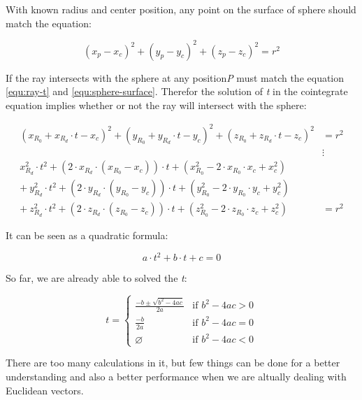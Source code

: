 With known radius and center position, any point on the surface of sphere should match the equation:

\begin{equation}\label{equ:sphere-surface}
(x_{p} - x_{c})^2 + (y_{p} - y_{c})^2 + (z_{p} - z_{c})^2 = r^2
\end{equation}

If the ray intersects with the sphere at any position\emph{P} must match the equation \ref{equ:ray-t} and \ref{equ:sphere-surface}. Therefor the solution of \emph{t} in the cointegrate equation implies whether or not the ray will intersect with the sphere:

\begin{equation}\label{equ:ray-sphere}
\begin{aligned}
(x_{R_{0}} + x_{R_{d}} \cdot t - x_{c})^2 + (y_{R_{0}} + y_{R_{d}} \cdot t - y_{c})^2 + (z_{R_{0}} + z_{R_{d}} \cdot t - z_{c})^2 &= r^2 \\
&\vdots \\
x_{R_{d}}^2 \cdot t^2 + (2 \cdot x_{R_{d}} \cdot (x_{R_{0}} - x_{c})) \cdot t + (x_{R_{0}}^2 - 2 \cdot x_{R_{0}}\cdot x_{c} + x_{c}^2) & \\
+\ y_{R_{d}}^2 \cdot t^2 + (2 \cdot y_{R_{d}} \cdot (y_{R_{0}} - y_{c})) \cdot t + (y_{R_{0}}^2 - 2 \cdot y_{R_{0}}\cdot y_{c} + y_{c}^2) & \\
+\ z_{R_{d}}^2 \cdot t^2 + (2 \cdot z_{R_{d}} \cdot (z_{R_{0}} - z_{c})) \cdot t + (z_{R_{0}}^2 - 2 \cdot z_{R_{0}}\cdot z_{c} + z_{c}^2) &= r^2
\end{aligned}
\end{equation}

It can be seen as a quadratic formula:

\begin{equation}\label{equ:sphere-surface-quadratic-formula}
a \cdot t^2 + b \cdot t + c = 0
\end{equation}

So far, we are already able to solved the \emph{t}:

\[
t =
\begin{cases}
\frac{-b \pm \sqrt{b^2 - 4ac}}{2a} & \text{if } b^2 - 4ac > 0 \\
\frac{-b}{2a} & \text{if } b^2 - 4ac = 0 \\
\varnothing & \text{if } b^2 - 4ac < 0
\end{cases}
\]

There are too many calculations  in it, but few things can be done for a better understanding and also a better performance when we are altually dealing with Euclidean vectors.


